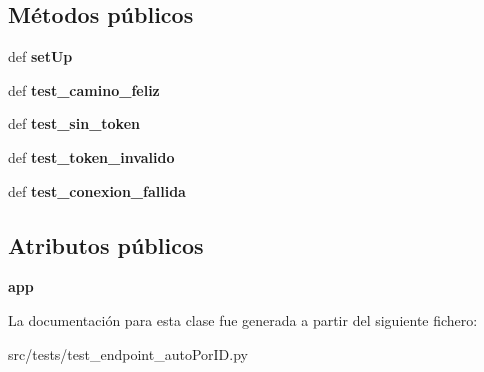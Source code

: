 \subsection*{Métodos públicos}
\begin{DoxyCompactItemize}
\item 
\hypertarget{classsrc_1_1tests_1_1test__endpoint__auto_por_i_d_1_1_test_endpoint_auto_por_i_d_a285971f8807370c1fa4bd6c7effcd6f1}{def {\bfseries set\-Up}}\label{classsrc_1_1tests_1_1test__endpoint__auto_por_i_d_1_1_test_endpoint_auto_por_i_d_a285971f8807370c1fa4bd6c7effcd6f1}

\item 
\hypertarget{classsrc_1_1tests_1_1test__endpoint__auto_por_i_d_1_1_test_endpoint_auto_por_i_d_af78c8558cf88684384ed6a5996d657fb}{def {\bfseries test\-\_\-camino\-\_\-feliz}}\label{classsrc_1_1tests_1_1test__endpoint__auto_por_i_d_1_1_test_endpoint_auto_por_i_d_af78c8558cf88684384ed6a5996d657fb}

\item 
\hypertarget{classsrc_1_1tests_1_1test__endpoint__auto_por_i_d_1_1_test_endpoint_auto_por_i_d_a5b3b8fc1a23fe86dc17b77dd24ac540c}{def {\bfseries test\-\_\-sin\-\_\-token}}\label{classsrc_1_1tests_1_1test__endpoint__auto_por_i_d_1_1_test_endpoint_auto_por_i_d_a5b3b8fc1a23fe86dc17b77dd24ac540c}

\item 
\hypertarget{classsrc_1_1tests_1_1test__endpoint__auto_por_i_d_1_1_test_endpoint_auto_por_i_d_a96dd6e9682e4c6de674abc61fa582fbd}{def {\bfseries test\-\_\-token\-\_\-invalido}}\label{classsrc_1_1tests_1_1test__endpoint__auto_por_i_d_1_1_test_endpoint_auto_por_i_d_a96dd6e9682e4c6de674abc61fa582fbd}

\item 
\hypertarget{classsrc_1_1tests_1_1test__endpoint__auto_por_i_d_1_1_test_endpoint_auto_por_i_d_a5d55a58bb4b9191aa97d47e16b708b37}{def {\bfseries test\-\_\-conexion\-\_\-fallida}}\label{classsrc_1_1tests_1_1test__endpoint__auto_por_i_d_1_1_test_endpoint_auto_por_i_d_a5d55a58bb4b9191aa97d47e16b708b37}

\end{DoxyCompactItemize}
\subsection*{Atributos públicos}
\begin{DoxyCompactItemize}
\item 
\hypertarget{classsrc_1_1tests_1_1test__endpoint__auto_por_i_d_1_1_test_endpoint_auto_por_i_d_a0ca8239725f94499916f1b151ae7f560}{{\bfseries app}}\label{classsrc_1_1tests_1_1test__endpoint__auto_por_i_d_1_1_test_endpoint_auto_por_i_d_a0ca8239725f94499916f1b151ae7f560}

\end{DoxyCompactItemize}


La documentación para esta clase fue generada a partir del siguiente fichero\-:\begin{DoxyCompactItemize}
\item 
src/tests/test\-\_\-endpoint\-\_\-auto\-Por\-I\-D.\-py\end{DoxyCompactItemize}
